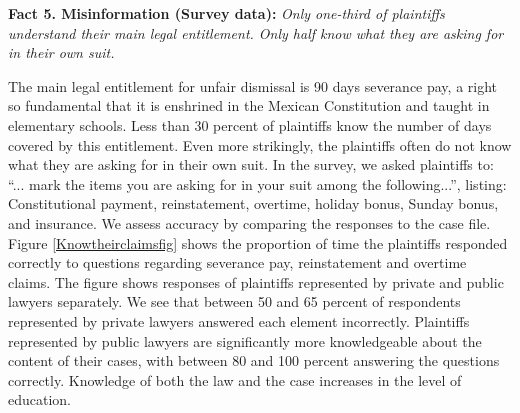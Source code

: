 \documentclass[11pt, a4paper]{article}
\begin{document}


\vspace{.15in}
\textbf{Fact 5. Misinformation (Survey data):} \emph{Only one-third of plaintiffs understand their main legal entitlement. Only half know what they are asking for in their own suit.}
\vspace{.07in}

The main legal entitlement for unfair dismissal is 90 days severance pay, a right so fundamental that it is enshrined in the Mexican Constitution and taught in elementary schools. Less than 30 percent of plaintiffs know the number of days covered by this entitlement. Even more strikingly, the plaintiffs often do not know what they are asking for in their own suit. In the survey, we asked plaintiffs to: ``... mark the items you are asking for in your suit among the following...'', listing: Constitutional payment, reinstatement, overtime, holiday bonus, Sunday bonus, and insurance.  We assess accuracy by comparing the responses to the case file. Figure \ref{Knowtheirclaimsfig} shows the proportion of time the plaintiffs responded correctly to questions regarding severance pay, reinstatement and overtime claims. The figure shows responses of plaintiffs represented by private and public lawyers separately. We see that between 50 and 65 percent of respondents represented by private lawyers answered each element incorrectly. Plaintiffs represented by public lawyers are significantly more knowledgeable about the content of their cases, with between 80 and 100 percent answering the questions correctly. Knowledge of both the law and the case increases in the level of education. 
\end{document}
